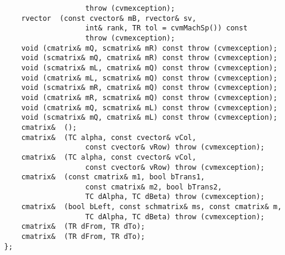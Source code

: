 \verb"                   throw (cvmexception);"\\
\verb"    rvector "\verb" (const cvector& mB, rvector& sv,"\\
\verb"                   int& rank, TR tol = cvmMachSp()) const"\\
\verb"                   throw (cvmexception);"\\
\verb"    void "\verb"(cmatrix& mQ, scmatrix& mR) const throw (cvmexception);"\\
\verb"    void "\verb"(scmatrix& mQ, cmatrix& mR) const throw (cvmexception);"\\
\verb"    void "\verb"(scmatrix& mL, cmatrix& mQ) const throw (cvmexception);"\\
\verb"    void "\verb"(cmatrix& mL, scmatrix& mQ) const throw (cvmexception);"\\
\verb"    void "\verb"(scmatrix& mR, cmatrix& mQ) const throw (cvmexception);"\\
\verb"    void "\verb"(cmatrix& mR, scmatrix& mQ) const throw (cvmexception);"\\
\verb"    void "\verb"(cmatrix& mQ, scmatrix& mL) const throw (cvmexception);"\\
\verb"    void "\verb"(scmatrix& mQ, cmatrix& mL) const throw (cvmexception);"\\
\verb"    cmatrix& "\verb" ();"\\
\verb"    cmatrix& "\verb" (TC alpha, const cvector& vCol,"\\
\verb"                   const cvector& vRow) throw (cvmexception);"\\
\verb"    cmatrix& "\verb" (TC alpha, const cvector& vCol,"\\
\verb"                   const cvector& vRow) throw (cvmexception);"\\
\verb"    cmatrix& "\verb" (const cmatrix& m1, bool bTrans1,"\\
\verb"                   const cmatrix& m2, bool bTrans2,"\\
\verb"                   TC dAlpha, TC dBeta) throw (cvmexception);"\\
\verb"    cmatrix& "\verb" (bool bLeft, const schmatrix& ms, const cmatrix& m,"\\
\verb"                   TC dAlpha, TC dBeta) throw (cvmexception);"\\
\verb"    cmatrix& "\verb" (TR dFrom, TR dTo);"\\
\verb"    cmatrix& "\verb" (TR dFrom, TR dTo);"\\
\verb"};"
\newpage





